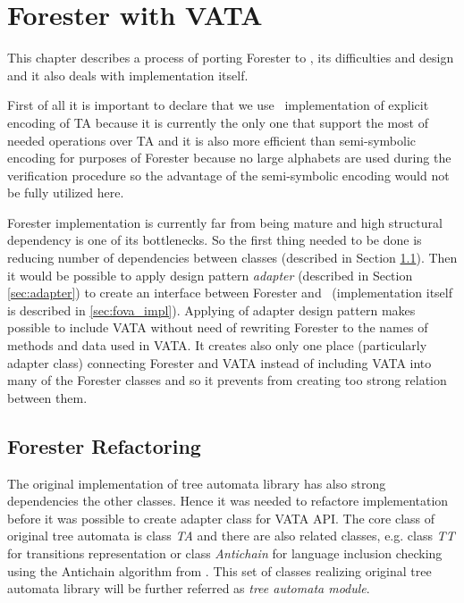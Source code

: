 \chapter{Forester with VATA}
\label{ch:fova}

This chapter describes a process of porting Forester to \vata, its difficulties and design and it also deals with implementation
itself.

First of all it is important to declare that we use \vata\ implementation of explicit encoding of TA because
it is currently the only one that support the most of needed operations over TA and it is also more efficient than
semi-symbolic encoding for purposes of Forester because no large alphabets are used during the verification procedure
so the advantage of the semi-symbolic encoding would not be fully utilized here.

Forester implementation is currently far from being mature and high structural dependency is
one of its bottlenecks.
So the first thing needed to be done is reducing number of dependencies between classes (described in Section \ref{sec:forester_prep}).
Then it would be possible to apply design pattern \emph{adapter} \cite{gamma95} (described in Section \ref{sec:adapter}) to create
an interface between Forester and \vata\ (implementation itself is described in \ref{sec:fova_impl}).
Applying of adapter design pattern makes possible to include VATA without need of rewriting
Forester to the names of methods and data used in VATA.
It creates also only one place (particularly adapter class) connecting Forester and VATA instead of
including VATA into many of the Forester classes and so it prevents from creating too strong relation between them.

\section{Forester Refactoring}
\label{sec:forester_prep}

The original implementation of tree automata library has also strong dependencies
the other classes.
Hence it was needed to refactore implementation before it was possible to create adapter class for VATA API.
The core class of original tree automata is class \emph{TA} and there are also related classes,
e.g. class \emph{TT} for transitions representation or class \emph{Antichain} for language inclusion checking using the Antichain algorithm from \cite{tacas10}.
This set of classes realizing original tree automata library will be further referred as \emph{tree automata module}.

